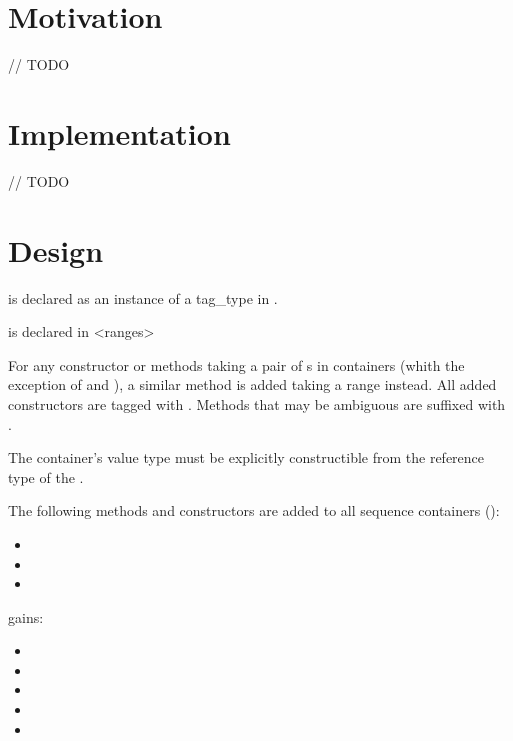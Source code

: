 \documentclass{wg21}
\begin{document}
\section{Motivation}

// TODO

\section{Implementation}

// TODO

\section{Design}

 is declared as an instance of a tag_type  in .

 is declared in <ranges>

For any constructor or methods taking a pair of s in containers (whith the exception of  and ),
a similar method is added taking a range instead.
All added constructors are tagged with . Methods that may be ambiguous are suffixed  with .

The container's value type must be explicitly constructible from the reference type of the  .

The following methods and constructors are added to all sequence containers ():

\begin{itemize}
    \item {}
    \item {}
    \item {}
\end{itemize}

 gains:

\begin{itemize}
\item {}
\item {}
\item {}
\item {}
\item {}
\end{itemize}
\end{document}

